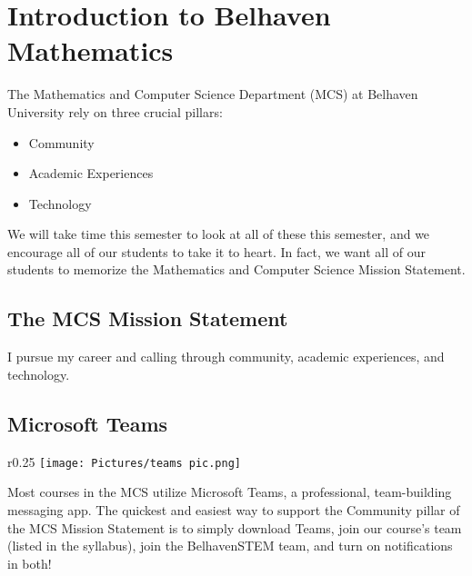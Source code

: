 
\section{Introduction to Belhaven Mathematics}\label{intro}

The Mathematics and Computer Science Department (MCS) at Belhaven University rely on three crucial pillars: 

\begin{itemize}
    \item Community
    \item Academic Experiences
    \item Technology
\end{itemize}

\noindent We will take time this semester to look at all of these this semester, and we encourage all of our students to take it to heart. In fact, we want all of our students to memorize the Mathematics and Computer Science Mission Statement.

\subsection{The MCS Mission Statement}

I pursue my career and calling through community, academic experiences, and technology.

\subsection{Microsoft Teams}

\begin{wrapfigure}{r}{0.25\textwidth} %
    \centering
    \texttt{[image: Pictures/teams pic.png]}
    \label{fig:teams}
\end{wrapfigure}

Most courses in the MCS utilize Microsoft Teams, a professional, team-building messaging app. The quickest and easiest way to support the Community pillar of the MCS Mission Statement is to simply download Teams, join our course's team (listed in the syllabus), join the BelhavenSTEM team, and turn on notifications in both!



